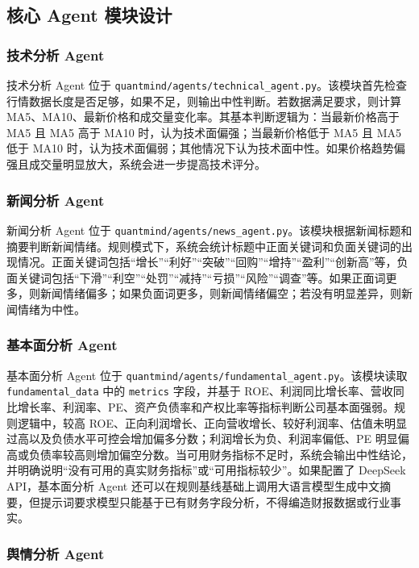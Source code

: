 \documentclass[UTF8,a4paper,12pt]{ctexart}
\begin{document}
\subsection{核心 Agent 模块设计}

\subsubsection{技术分析 Agent}

技术分析 Agent 位于 \texttt{quantmind/agents/technical\_agent.py}。该模块首先检查行情数据长度是否足够，如果不足，则输出中性判断。若数据满足要求，则计算 MA5、MA10、最新价格和成交量变化率。其基本判断逻辑为：当最新价格高于 MA5 且 MA5 高于 MA10 时，认为技术面偏强；当最新价格低于 MA5 且 MA5 低于 MA10 时，认为技术面偏弱；其他情况下认为技术面中性。如果价格趋势偏强且成交量明显放大，系统会进一步提高技术评分。

\subsubsection{新闻分析 Agent}

新闻分析 Agent 位于 \texttt{quantmind/agents/news\_agent.py}。该模块根据新闻标题和摘要判断新闻情绪。规则模式下，系统会统计标题中正面关键词和负面关键词的出现情况。正面关键词包括“增长”“利好”“突破”“回购”“增持”“盈利”“创新高”等，负面关键词包括“下滑”“利空”“处罚”“减持”“亏损”“风险”“调查”等。如果正面词更多，则新闻情绪偏多；如果负面词更多，则新闻情绪偏空；若没有明显差异，则新闻情绪为中性。

\subsubsection{基本面分析 Agent}

基本面分析 Agent 位于 \texttt{quantmind/agents/fundamental\_agent.py}。该模块读取 \texttt{fundamental\_data} 中的 \texttt{metrics} 字段，并基于 ROE、利润同比增长率、营收同比增长率、利润率、PE、资产负债率和产权比率等指标判断公司基本面强弱。规则逻辑中，较高 ROE、正向利润增长、正向营收增长、较好利润率、估值未明显过高以及负债水平可控会增加偏多分数；利润增长为负、利润率偏低、PE 明显偏高或负债率较高则增加偏空分数。当可用财务指标不足时，系统会输出中性结论，并明确说明“没有可用的真实财务指标”或“可用指标较少”。如果配置了 DeepSeek API，基本面分析 Agent 还可以在规则基线基础上调用大语言模型生成中文摘要，但提示词要求模型只能基于已有财务字段分析，不得编造财报数据或行业事实。

\subsubsection{舆情分析 Agent}
\end{document}
